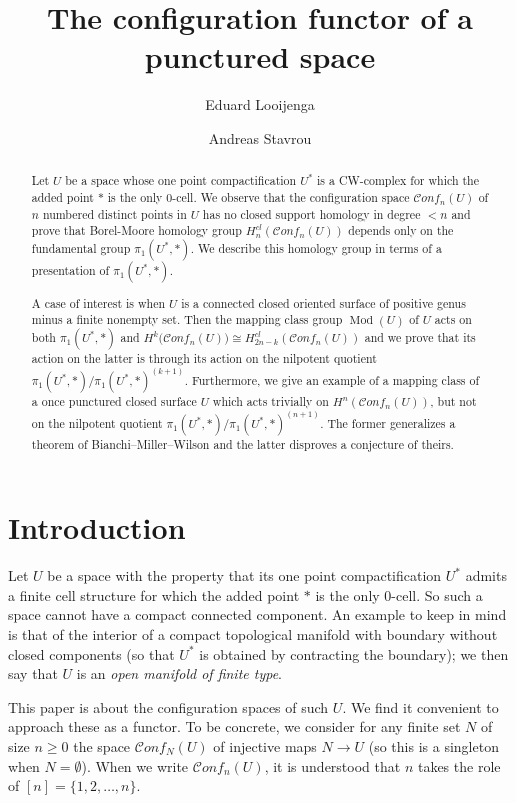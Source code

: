 \documentclass[12pt,letterpaper]{amsart}
\title[Configuration functor of a punctured space]{The configuration functor of a punctured space}
\author{Eduard Looijenga}
\author{Andreas Stavrou}
\numberwithin{equation}{section}
\newcommand\conf{\mathscr{C}\!\mathit{onf}\!}
\newcommand\Mod{\operatorname{Mod}}
\theoremstyle{remark}
\begin{document}
\begin{abstract} 
Let $U$ be a space whose one point compactification $U^*$ is a CW-complex  for which the added point $*$ is the only $0$-cell. 
We observe that  the configuration space $\conf_n(U)$ of $n$ numbered distinct points in $U$ 
has no closed support homology in degree $<n$ and prove that  Borel-Moore homology group $H^{cl}_n(\conf_n(U))$ depends only on the fundamental group $\pi_1(U^*,*)$.  
We describe this homology group in terms of a presentation of $\pi_1(U^*,*)$.
 
A case of interest is when $U$ is a connected closed oriented surface  of positive genus minus a finite nonempty set. 
Then the  mapping class group $\Mod(U)$ of $U$  acts on both $\pi_1(U^*,*)$ and ${H^k}(\conf_n(U){)}\cong H^{cl}_
{2n-k}(\conf_n(U))$ and we prove that its action on the latter is
through its action on the nilpotent quotient $\pi_1(U^*,*)/ \pi_1(U^*,*)^{(k+1)}$.  Furthermore, we give an example of a mapping class of a once punctured closed surface $U$ which acts trivially on ${H^n}(\conf_n(U))$, but not on the nilpotent quotient $\pi_1(U^*,*)/ \pi_1(U^*,*)^{(n+1)}$. The former generalizes a theorem of Bianchi--Miller--Wilson and the latter  disproves a conjecture of theirs.
\end{abstract}
\maketitle
 
\section{Introduction}
Let $U$ be a space with the property that its one point compactification $U^*$ admits a  finite cell structure for which the added point $*$ is the only $0$-cell. So such a space cannot have a compact connected component. An example  to keep in mind is that of the  interior of a compact topological manifold with boundary without closed  components (so that $U^*$ is obtained by contracting the boundary); we then say that $U$ is an \emph{open manifold of finite type}.

This paper is about the configuration spaces of such $U$. We find it convenient to approach these as a functor.
To be concrete,  we consider for any   finite set $N$ of size $n\ge 0$  the space $\conf_N(U)$ of injective maps $N\to U$ (so this is a singleton when $N=\emptyset$). When  we  write $\conf_n(U)$, it is understood that $n$ takes the role of $[n]=\{1,2,\dots, n\}$. 
\end{document}
